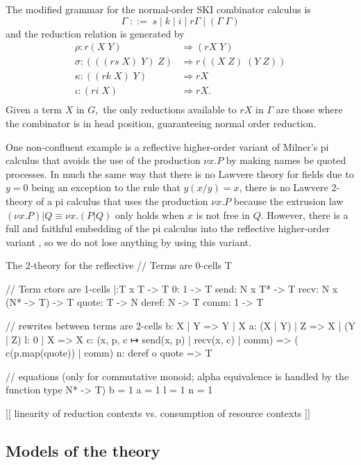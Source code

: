 \documentclass[]{acm_proc_article-sp}
\numberwithin{equation}{subsection}
\begin{document}
The modified grammar for the normal-order SKI combinator calculus is
\[ \Gamma\; ::=\; s\; |\; k\; |\; i\; |\; r\Gamma\; |\; (\Gamma\; \Gamma) \]
and the reduction relation is generated by
\[\begin{array}{rl}
  \rho\colon r(X\; Y)  & \Rightarrow (rX\; Y) \\
  \sigma\colon (((rs\; X)\; Y)\; Z) & \Rightarrow r((X\; Z)\; (Y\; Z))\\
  \kappa\colon ((rk\; X)\; Y) & \Rightarrow rX\\
  \iota\colon (ri\; X)  & \Rightarrow rX.\\
\end{array}\]
Given a term $X$ in $G,$ the only reductions available to $rX$ in $\Gamma$ are those where the combinator is in head position, guaranteeing normal order reduction.

One non-confluent example is a reflective higher-order variant of Milner's pi calculus that avoids the use of the production $\nu x.P$ by making names be quoted processes.  In much the same way that there is no Lawvere theory for fields due to $y=0$ being an exception to the rule that $y(x/y) = x$, there is no Lawvere 2-theory of a pi calculus that uses the production $\nu x.P$ because the extrusion law $(\nu x.P) | Q \equiv \nu x.(P | Q)$ only holds when $x$ is not free in $Q.$  However, there is a full and faithful embedding of the pi calculus into the reflective higher-order variant \cite{RHO}, so we do not lose anything by using this variant.

The 2-theory for the reflective 
// Terms are 0-cells
T

// Term ctors are 1-cells
|:T x T -> T
0: 1 -> T
send: N x T* -> T
recv: N x (N* -> T) -> T
quote: T -> N
deref: N -> T
comm: 1 -> T 

// rewrites between terms are 2-cells
b: X | Y => Y | X
a: (X | Y) | Z => X | (Y | Z)
l: 0 | X => X
c: (x, p, c ↦ send(x, p) | recv(x, c) | comm) => ( c(p.map(quote)) | comm)
n: deref o quote => T

// equations (only for commutative monoid; alpha equivalence is handled by the function type N* -> T)
b = 1
a = 1
l = 1
n = 1

[[ linearity of reduction contexts vs. consumption of resource contexts ]]


\subsection{Models of the theory}
\end{document}
